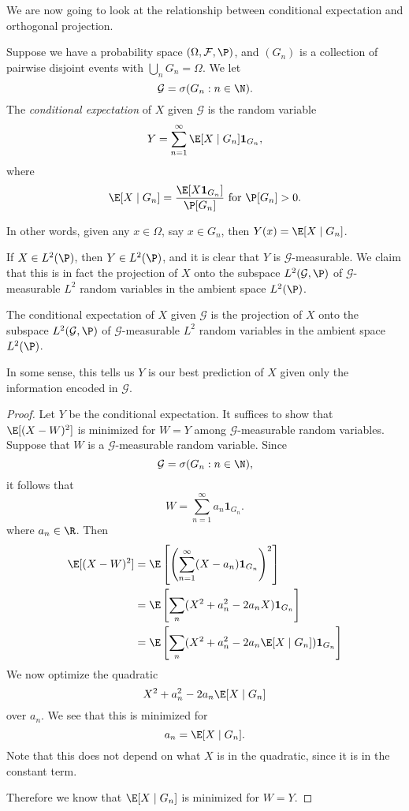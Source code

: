 \documentclass[a4paper]{article}
\begin{document}
We are now going to look at the relationship between conditional expectation and orthogonal projection.
\begin{defi}
  Suppose we have a probability space $(\Omega, \mathcal{F}, \P)$, and $(G_n)$ is a collection of pairwise disjoint events with $\bigcup_n G_n = \Omega$. We let
  \[
    \mathcal{G} = \sigma(G_n: n \in \N).
  \]
  The \emph{conditional expectation} of $X$ given $\mathcal{G}$ is the random variable
  \[
    Y = \sum_{n = 1}^\infty \E[X \mid G_n] \mathbf{1}_{G_n},
  \]
  where
  \[
    \E[X \mid G_n] = \frac{\E [X \mathbf{1}_{G_n}]}{ \P[G_n]}\text{ for }\P[G_n] > 0.
  \]
\end{defi}
In other words, given any $x \in \Omega$, say $x \in G_n$, then $Y(x) = \E[X \mid G_n]$.

If $X \in L^2(\P)$, then $Y \in L^2(\P)$, and it is clear that $Y$ is $\mathcal{G}$-measurable. We claim that this is in fact the projection of $X$ onto the subspace $L^2(\mathcal{G}, \P)$ of $\mathcal{G}$-measurable $L^2$ random variables in the ambient space $L^2(\P)$.

\begin{prop}
  The conditional expectation of $X$ given $\mathcal{G}$ is the projection of $X$ onto the subspace $L^2(\mathcal{G}, \P)$ of $\mathcal{G}$-measurable $L^2$ random variables in the ambient space $L^2(\P)$.
\end{prop}
In some sense, this tells us $Y$ is our best prediction of $X$ given only the information encoded in $\mathcal{G}$.

\begin{proof}
  Let $Y$ be the conditional expectation. It suffices to show that $\E[(X - W)^2]$ is minimized for $W = Y$ among $\mathcal{G}$-measurable random variables. Suppose that $W$ is a $\mathcal{G}$-measurable random variable. Since
  \[
    \mathcal{G} = \sigma(G_n: n \in \N),
  \]
  it follows that
  \[
    W = \sum_{n = 1}^\infty a_n \mathbf{1}_{G_n}.
  \]
  where $a_n \in \R$. Then
  \begin{align*}
    \E[(X - W)^2] &= \E\left[\left(\sum_{n = 1}^\infty (X - a_n) \mathbf{1}_{G_n}\right)^2\right]\\
    &= \E\left[\sum_n (X^2 + a_n^2 - 2a_n X)\mathbf{1}_{G_n}\right]\\
    &= \E\left[\sum_n (X^2 + a_n^2 - 2a_n \E[X\mid G_n])\mathbf{1}_{G_n}\right]
  \end{align*}
  We now optimize the quadratic
  \[
    X^2 + a_n^2 - 2 a_n \E[X \mid G_n]
  \]
  over $a_n$. We see that this is minimized for
  \[
    a_n = \E[X \mid G_n].
  \]
  Note that this does not depend on what $X$ is in the quadratic, since it is in the constant term.

  Therefore we know that $\E[X\mid G_n]$ is minimized for $W = Y$.
\end{proof}
\end{document}
